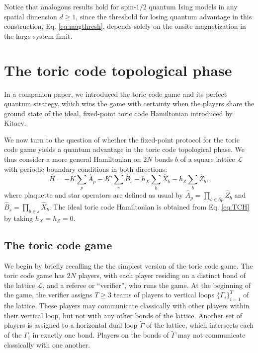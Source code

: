 \documentclass[prb,twocolumn,showpacs,amssymb,superscriptaddress]{revtex4-2}
\begin{document}
Notice that analogous results hold for spin-$1/2$ quantum Ising models in any spatial dimension $d \geq 1$, since the threshold for losing quantum advantage in this construction, Eq. \eqref{eq:magthresh}, depends solely on the onsite magnetization in the large-system limit.

\section{The toric code topological phase}


In a companion paper\cite{companion}, we introduced the toric code game and its perfect quantum strategy, which wins the game with certainty when the players share the ground state of the ideal, fixed-point toric code Hamiltonian introduced by Kitaev\cite{KITAEV20032}.

We now turn to the question of whether the fixed-point protocol for the toric code game yields a quantum advantage in the toric code topological phase. We thus consider a more general Hamiltonian
on $2N$ bonds $b$ of a square lattice $\mathcal{L}$ with periodic boundary conditions in both directions:
\begin{equation}
\label{eq:TCH}
\hat{H} = - K \sum_{p} \hat{A}_p - K' \sum_s \hat{B}_s - h_X \sum_{b} \hat{X}_b - h_Z \sum_b \hat{Z}_b,
\end{equation}
where plaquette and star operators are defined as usual\cite{KITAEV20032,LaumannKitaev} by $\hat{A}_p = \prod_{b \in \partial p} \hat{Z}_b$ and  $\hat{B}_s = \prod_{b \in s} \hat{X}_b$. 
The ideal toric code Hamiltonian is obtained from Eq. \eqref{eq:TCH} by taking $h_X = h_Z = 0$. 

\subsection{The toric code game}

We begin by briefly recalling the the simplest version of the toric code game\cite{companion}. The toric code game has $2N$ players, with each player residing on a distinct bond of the lattice $\mathcal{L}$, and a referee or ``verifier'', who runs the game. At the beginning of the game, the verifier assigns $T \geq 3$ teams of players to vertical loops $\{\Gamma_i\}_{i=1}^T$ of the lattice. These players may communicate classically with other players within their vertical loop, but not with any other bonds of the lattice. Another set of players is assigned to a horizontal dual loop $\widetilde{\Gamma}$ of the lattice, which intersects each of the $\Gamma_i$ in exactly one bond. Players on the bonds of $\widetilde{\Gamma}$ may not communicate classically with one another. 
\end{document}
